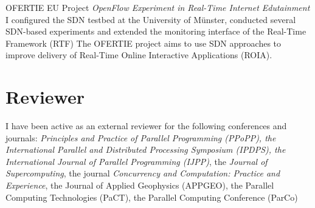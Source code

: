 \documentclass[11pt,a4paper]{moderncv}
\begin{document}
					{OFERTIE EU Project}
					{\textit{OpenFlow Experiment in Real-Time Internet Edutainment}}{}{}
					{
					 I configured the SDN
					 testbed at the University of Münster, conducted several SDN-based experiments
					 and extended the monitoring interface of the Real-Time Framework (RTF)
					 The OFERTIE project aims to use SDN approaches to improve delivery of Real-Time Online
					 Interactive Applications (ROIA).
					}

\section{Reviewer}

				 {I have been active as an external reviewer for the following conferences and journals:
                  \emph{Principles and Practice of Parallel Programming (PPoPP),
                    the International Parallel and Distributed Processing Symposium (IPDPS),
                    the International Journal of Parallel Programming (IJPP)},
					the \emph{Journal of Supercomputing},
					the journal \emph{Concurrency and Computation: Practice and Experience},
                    the Journal of Applied Geophysics (APPGEO),
					the Parallel Computing Technologies (PaCT),
					the Parallel Computing Conference (ParCo)
				 }
\end{document}
